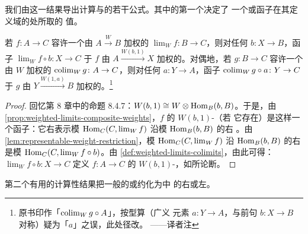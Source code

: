 我们由这一结果导出计算\trWeightedLimit{}与\trWeightedColimit{}的若干公式。其中的第一个决定了
一个\trWeightedLimit{}或\trWeightedColimit{}函子在其定义域的\trGeneralizedElement{}处所取的
值。

\begin{lemma}\label{lem:weighted-limit-generalized-element}
若 $f\colon A\to C$ 容许一个由 $A\xrightarrow{W}B$ 加权的\trLimit{}
$\lim_{W}f\colon B\to C$，则对任何\trGeneralizedElement{} $b\colon X\to B$，函子
$\lim_{W}f\circ b\colon X\to C$ \trIsomorphism{}于 $f$ 由 $A\xrightarrow{W(b,1)}X$
加权的\trLimit{}。对偶地，若 $g\colon B\to C$ 容许一个由 $W$ 加权的\trColimit{}
$\mathop{\mathrm{colim}}\nolimits_{W}g\colon A\to C$，则对任何\trGeneralizedElement{} $a\colon Y\to A$，函子
$\mathop{\mathrm{colim}}\nolimits_{W}g\circ a\colon Y\to C$ \trIsomorphism{}于 $g$ 由 $Y\xrightarrow{W(1,a)}B$
加权的\trColimit{}。\footnote{原书印作「$\mathop{\mathrm{colim}}\nolimits_{W}g\circ A$」，按型算（广义
元素 $a\colon Y\to A$，与前句 $b\colon X\to B$ 对称）疑为「$a$」之误，此处径改。
——译者注}
\end{lemma}

\begin{proof}
回忆第 8 章中的命题 8.4.7：$W(b,1)\cong W\otimes\mathrm{Hom}_{B}(b,B)$。于是，由%
\cref{prop:weighted-limits-composite-weights}，$f$ 的 $W(b,1)$-\trWeightedLimit{}（若
它存在）是这样一个函子：它右表示模 $\mathrm{Hom}_{C}(C,\lim_{W}f)$ 沿模 $\mathrm{Hom}_{B}(b,B)$ 的右%
\trExtension{}。由\cref{lem:representable-weight-restriction}，模 $\mathrm{Hom}_{C}(C,\lim_{W}f)$
沿 $\mathrm{Hom}_{B}(b,B)$ 的右\trExtension{}是模 $\mathrm{Hom}_{C}(C,\lim_{W}f\circ b)$。由%
\cref{def:weighted-limits-colimits}，由此可得：$\lim_{W}f\circ b\colon X\to C$ 定义
$f\colon A\to C$ 的 $W(b,1)$-\trWeightedLimit，如所论断。
\end{proof}

第二个有用的计算性结果把一般的\trWeightedLimit{}或\trWeightedColimit{}约化为\trHomotopyTwoCategory{}中
的右\trExtension{}或左\trExtension{}。

